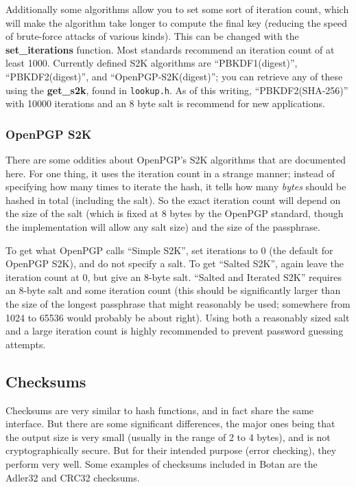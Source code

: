 \documentclass{article}
\newcommand{\filename}[1]{\texttt{#1}}
\newcommand{\function}[1]{\textbf{#1}}
\begin{document}
Additionally some algorithms allow you to set some sort of iteration
count, which will make the algorithm take longer to compute the final
key (reducing the speed of brute-force attacks of various kinds). This
can be changed with the \function{set\_iterations} function. Most
standards recommend an iteration count of at least 1000. Currently
defined S2K algorithms are ``PBKDF1(digest)'', ``PBKDF2(digest)'', and
``OpenPGP-S2K(digest)''; you can retrieve any of these using the
\function{get\_s2k}, found in \filename{lookup.h}. As of this writing,
``PBKDF2(SHA-256)'' with 10000 iterations and an 8 byte salt is
recommend for new applications.

\subsubsection{OpenPGP S2K}

There are some oddities about OpenPGP's S2K algorithms that are documented
here. For one thing, it uses the iteration count in a strange manner; instead
of specifying how many times to iterate the hash, it tells how many
\emph{bytes} should be hashed in total (including the salt). So the exact
iteration count will depend on the size of the salt (which is fixed at 8 bytes
by the OpenPGP standard, though the implementation will allow any salt size)
and the size of the passphrase.

To get what OpenPGP calls ``Simple S2K'', set iterations to 0 (the default for
OpenPGP S2K), and do not specify a salt. To get ``Salted S2K'', again leave the
iteration count at 0, but give an 8-byte salt. ``Salted and Iterated S2K''
requires an 8-byte salt and some iteration count (this should be significantly
larger than the size of the longest passphrase that might reasonably be used;
somewhere from 1024 to 65536 would probably be about right). Using both a
reasonably sized salt and a large iteration count is highly recommended to
prevent password guessing attempts.

\subsection{Checksums}

Checksums are very similar to hash functions, and in fact share the same
interface. But there are some significant differences, the major ones being
that the output size is very small (usually in the range of 2 to 4 bytes), and
is not cryptographically secure. But for their intended purpose (error
checking), they perform very well. Some examples of checksums included in Botan
are the Adler32 and CRC32 checksums.
\end{document}

